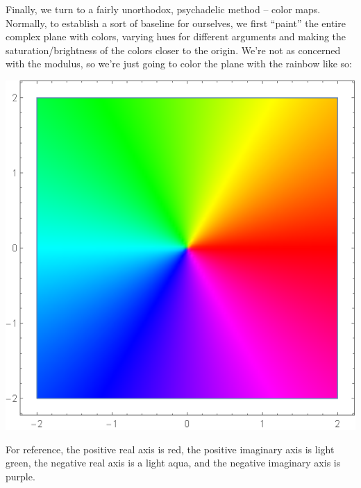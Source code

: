 \documentclass[12pt]{scrartcl}
\begin{document}
Finally, we turn to a fairly unorthodox, psychadelic method -- color maps. Normally, to establish a sort of baseline for ourselves, we first ``paint'' the entire complex plane with colors, varying hues for different arguments and making the saturation/brightness of the colors closer to the origin. We're not as concerned with the modulus, so we're just going to color the plane with the rainbow like so:
\begin{center}
	\includegraphics[scale=0.25]{images/colorbase.png}
\end{center}

For reference, the positive real axis is red, the positive imaginary axis is light green, the negative real axis is a light aqua, and the negative imaginary axis is purple.
\end{document}
